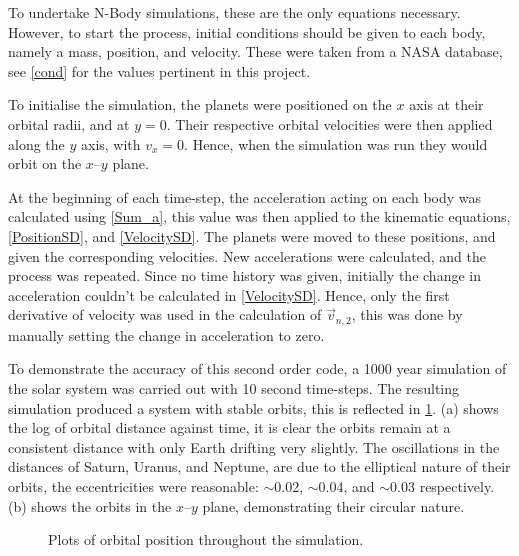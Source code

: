 \documentclass[a4paper,10pt]{article}
\begin{document}
To undertake N-Body simulations, these are the only equations necessary. However, to start the process, initial conditions should be given to each body, namely a mass, position, and velocity. These were taken from a NASA database\cite{PlanetFacts}, see \cref{cond} for the values pertinent in this project.  

To initialise the simulation, the planets were positioned on the $x$ axis at their orbital radii, and at $y=0$. Their respective orbital velocities were then applied along the $y$ axis, with $v_x = 0$. Hence, when the simulation was run they would orbit on the $x$--$y$ plane. 

At the beginning of each time-step, the acceleration acting on each body was calculated using \cref{Sum_a}, this value was then applied to the kinematic equations, \cref{PositionSD}, and \cref{VelocitySD}. The planets were moved to these positions, and given the corresponding velocities. New accelerations were calculated, and the process was repeated. Since no time history was given, initially the change in acceleration couldn't be calculated in \cref{VelocitySD}. Hence, only the first derivative of velocity was used in the calculation of $\vec v_{n,2}$, this was done by manually setting the change in acceleration to zero.

To demonstrate the accuracy of this second order code, a 1000 year simulation of the solar system was carried out with 10 second time-steps. The resulting simulation produced a system with stable orbits, this is reflected in \cref{Distance}.  (a) shows the log of orbital distance against time, it is clear the orbits remain at a consistent distance with only Earth drifting very slightly. The oscillations in the distances of Saturn, Uranus, and Neptune, are due to the elliptical nature of their orbits, the eccentricities were reasonable: $\sim$0.02, $\sim$0.04, and $\sim$0.03 respectively.  (b) shows the orbits in the $x$--$y$ plane, demonstrating their circular nature.

\begin{figure}[h!]
    \centering
    \qquad
    \caption{Plots of orbital position throughout the simulation.}%
    \label{Distance}%
\end{figure}
\end{document}
